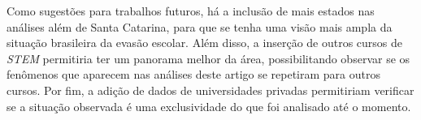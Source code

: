 \documentclass[a4paper]{article}
\begin{document}
Como sugestões para trabalhos futuros, há a inclusão de mais estados nas análises além de Santa Catarina, para que se tenha uma visão mais ampla da situação brasileira da evasão escolar. Além disso, a inserção de outros cursos de \textit{STEM} permitiria ter um panorama melhor da área, possibilitando observar se os fenômenos que aparecem nas análises deste artigo se repetiram para outros cursos. Por fim, a adição de dados de universidades privadas permitiriam verificar se a situação observada é uma exclusividade do que foi analisado até o momento.





\end{document}
